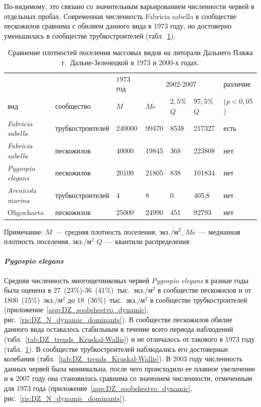 По-видимому, это связано со значительным варьированием численности червей в отдельных пробах. 
Современная численность Fabricia sabella в сообществе пескожилов сравнима с обилием данного вида в 1973 году, но достоверно уменьшилась в сообществе трубкостроителей (табл.~\ref{tab:DZ_donimamnts_1973_2000}).
\begin{table}[p]
\caption{Сравнение плотностей поселения массовых видов на литорали Дальнего Пляжа г.~Дальне-Зеленецкой в 1973 и 2000-х годах.}
\label{tab:DZ_donimamnts_1973_2000}
\begin{tabularx}{\textwidth}{XX|X|XXX|X}
\hline
		 &		    & $1973$ год	      & \multicolumn {3}{c|}{2002-2007} &	различие    \\
вид              & сообщество       & $M$               & $Me$         & $2,5$\% $Q$ & $97,5$\% $Q$ & ($p < 0,05$) \\ \hline
{\it Fabricia sabella} & труб\-ко\-стро\-ите\-лей & 240000          & 99470      & 8538    & 217327   & есть                      \\
{\it Fabricia sabella} & пес\-ко\-жи\-лов       & 40000           & 19845      & 368     & 223808   & нет                       \\
{\it Pygospio elegans} & пес\-ко\-жи\-лов       & 20100           & 21805      & 838     & 101834   & нет                       \\
{\it Arenicola marina} & труб\-ко\-стро\-ите\-лей & 4               & 8          & 0       & 405,8    & нет                       \\
Oligochaeta      & пес\-ко\-жи\-лов       & 25000           & 24990      & 451     & 92793    & нет                       \\ \hline
\end{tabularx}

{\footnotesize Примечание: $M$~--- средняя плотность поселения, экз./м$^2$, $Me$~--- медианная плотность поселения, экз./м$^2$ $Q$~--- квантили распределения}
\end{table}

\paragraph{\textit{Pygospio elegans}} 
Средняя численность многощетинковых червей {\it Pygospio elegans} в разные годы была оценена в 27~(23\%)-36~(41\%)~тыс.~экз./м$^2$ в сообществе пескожилов и от 1800~(15\%)~экз./м$^2$ до 18~(36\%)~тыс.~экз./м$^2$ в сообществе трубкостроителей (приложение~\ref{app:DZ_soobshestvo_dynamic}, рис.~\ref{ris:DZ_N_dynamic_dominants}). 
В сообществе пескожилов обилие данного вида оставалось стабильным в течение всего периода наблюдений (табл.~\ref{tab:DZ_trends_Kruskal-Wallis}) и не отличалось от такового в 1973 году (табл.~\ref{tab:DZ_donimamnts_1973_2000}). 
В сообществе трубкостроителей наблюдались его достоверные колебания (табл.~\ref{tab:DZ_trends_Kruskal-Wallis}). 
В 2003 году численность данных червей была минимальна, после чего происходило ее плавное увеличение и к 2007 году она становилась сравнима со значением численности, отмеченным для 1973 года (приложение~\ref{app:DZ_soobshestvo_dynamic}, рис.~\ref{ris:DZ_N_dynamic_dominants}). 

